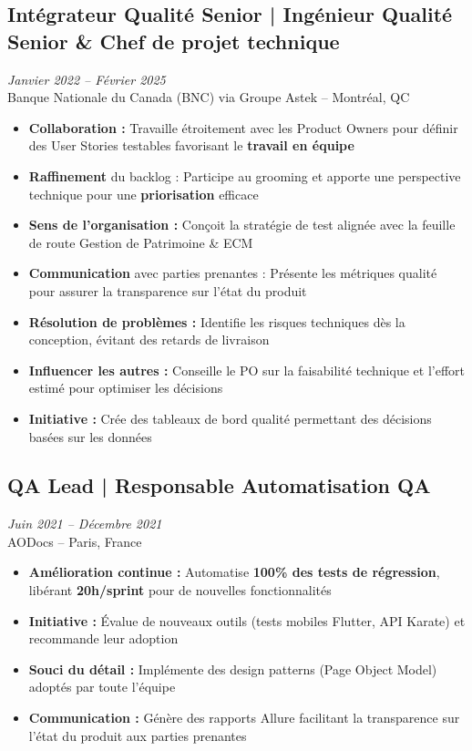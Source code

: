 \documentclass[11pt,a4paper]{article}
\newcommand{\highlight}[1]{\textcolor{primaryblue}{\textbf{#1}}}
\newcommand{\keypoint}[1]{\textbf{#1}}
\begin{document}
\subsection*{Intégrateur Qualité Senior | Ingénieur Qualité Senior \& Chef de projet technique} \hfill \textit{\color{mediumgray}Janvier 2022 -- Février 2025}\\
Banque Nationale du Canada (BNC) via Groupe Astek -- Montréal, QC
\begin{itemize}[leftmargin=22pt]
    \item \highlight{Collaboration :} Travaille étroitement avec les Product Owners pour définir des User Stories testables favorisant le \highlight{travail en équipe}
    \item \highlight{Raffinement} du backlog : Participe au grooming et apporte une perspective technique pour une \highlight{priorisation} efficace
    \item \highlight{Sens de l'organisation :} Conçoit la stratégie de test alignée avec la feuille de route Gestion de Patrimoine \& ECM
    \item \highlight{Communication} avec parties prenantes : Présente les métriques qualité pour assurer la transparence sur l'état du produit
    \item \highlight{Résolution de problèmes :} Identifie les risques techniques dès la conception, évitant des retards de livraison
    \item \highlight{Influencer les autres :} Conseille le PO sur la faisabilité technique et l'effort estimé pour optimiser les décisions
    \item \highlight{Initiative :} Crée des tableaux de bord qualité permettant des décisions basées sur les données
\end{itemize}

\subsection*{QA Lead | Responsable Automatisation QA} \hfill \textit{\color{mediumgray}Juin 2021 -- Décembre 2021}\\
AODocs -- Paris, France
\begin{itemize}[leftmargin=22pt]
    \item \highlight{Amélioration continue :} Automatise \keypoint{100\% des tests de régression}, libérant \keypoint{20h/sprint} pour de nouvelles fonctionnalités
    \item \highlight{Initiative :} Évalue de nouveaux outils (tests mobiles Flutter, API Karate) et recommande leur adoption
    \item \highlight{Souci du détail :} Implémente des design patterns (Page Object Model) adoptés par toute l'équipe
    \item \highlight{Communication :} Génère des rapports Allure facilitant la transparence sur l'état du produit aux parties prenantes
\end{itemize}
\end{document}

